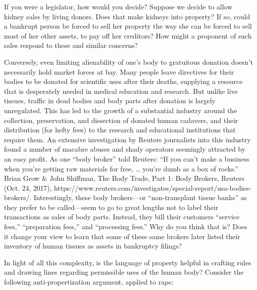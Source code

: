 If you were a legislator, how would you decide?  Suppose we decide to allow
kidney sales by living donors.  Does that make kidneys into property?  If so,
could a bankrupt person be forced to sell her property the way she can be
forced to sell most of her other assets, to pay off her creditors?  How might a
proponent of such sales respond to these and similar concerns?

Conversely, even limiting alienability of one's body to gratuitous donation
doesn't necessarily hold market forces at bay. Many people leave directives for
their bodies to be donated for scientific uses after their deaths, supplying a
resource that is desperately needed in medical education and research. But
unlike live tissues, traffic in dead bodies and body parts after donation is
largely unregulated.  This has led to the growth of a substantial industry
around the collection, preservation, and dissection of donated human cadavers,
and their distribution (for hefty fees) to the research and educational
institutions that require them. An extensive investigation by Reuters
journalists into this industry found a number of macabre abuses and shady
operators seemingly attracted by an easy profit. As one ``body broker'' told
Reuters: ``If you can't make a business when you're getting raw materials for
free, {\dots} you're dumb as a box of rocks.'' Brian Grow \& John Shiffman, The
Body Trade, Part 1: Body Brokers, Reuters (Oct. 24, 2017),
https://www.reuters.com/investigates/special-report/usa-bodies-brokers/. 
Interestingly, these body brokers---or ``non-transplant tissue banks'' as they
prefer to be called---seem to go to great lengths not to label their
transactions as sales of body parts. Instead, they bill their customers
``service fees,'' ``preparation fees,'' and ``processing fees.'' Why do you
think that is? Does it change your view to learn that some of these same
brokers later listed their inventory of human tissues as assets in bankruptcy
filings?

\item In light of all this complexity, is the language of property helpful in
crafting rules and drawing lines regarding permissible uses of the human body?
Consider the following anti-propertization argument, applied to rape:

